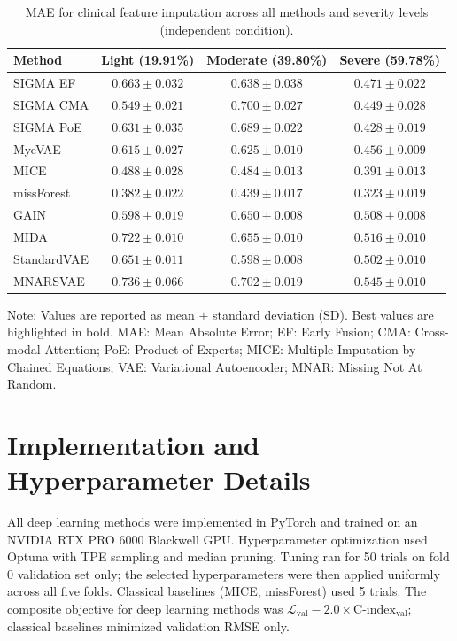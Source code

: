 \documentclass[final,3p,times,authoryear]{elsarticle}
\begin{document}
\begin{table}[!t]
\centering
{}
\caption{MAE for clinical feature imputation across all methods and severity levels (independent condition).}
\label{tab:supp_mae_c}
\begin{tabular}{lccc}
\toprule
Method & Light (19.91\%) & Moderate (39.80\%) & Severe (59.78\%) \\
\midrule
SIGMA EF & $0.663 \pm 0.032$ & $0.638 \pm 0.038$ & $0.471 \pm 0.022$ \\
SIGMA CMA & $0.549 \pm 0.021$ & $0.700 \pm 0.027$ & $0.449 \pm 0.028$ \\
SIGMA PoE & $0.631 \pm 0.035$ & $0.689 \pm 0.022$ & $0.428 \pm 0.019$ \\
MyeVAE & $0.615 \pm 0.027$ & $0.625 \pm 0.010$ & $0.456 \pm 0.009$ \\
MICE & $0.488 \pm 0.028$ & $0.484 \pm 0.013$ & $0.391 \pm 0.013$ \\
missForest & $\mathbf{0.382 \pm 0.022}$ & $\mathbf{0.439 \pm 0.017}$ & $\mathbf{0.323 \pm 0.019}$ \\
GAIN & $0.598 \pm 0.019$ & $0.650 \pm 0.008$ & $0.508 \pm 0.008$ \\
MIDA & $0.722 \pm 0.010$ & $0.655 \pm 0.010$ & $0.516 \pm 0.010$ \\
StandardVAE & $0.651 \pm 0.011$ & $0.598 \pm 0.008$ & $0.502 \pm 0.010$ \\
MNARSVAE & $0.736 \pm 0.066$ & $0.702 \pm 0.019$ & $0.545 \pm 0.010$ \\
\bottomrule
\end{tabular}

\vspace{1ex}
\footnotesize{Note: Values are reported as mean $\pm$ standard deviation (SD). Best values are highlighted in bold. MAE: Mean Absolute Error; EF: Early Fusion; CMA: Cross-modal Attention; PoE: Product of Experts; MICE: Multiple Imputation by Chained Equations; VAE: Variational Autoencoder; MNAR: Missing Not At Random.}
\end{table}

\appendix
\section{Implementation and Hyperparameter Details}
\label{app:hyperparams}

All deep learning methods were implemented in PyTorch and trained on an NVIDIA RTX PRO 6000 Blackwell GPU. Hyperparameter optimization used Optuna with TPE sampling and median pruning. Tuning ran for 50 trials on fold 0 validation set only; the selected hyperparameters were then applied uniformly across all five folds. Classical baselines (MICE, missForest) used 5 trials. The composite objective for deep learning methods was $\mathcal{L}_{\text{val}} - 2.0 \times \text{C-index}_{\text{val}}$; classical baselines minimized validation RMSE only.
\end{document}
